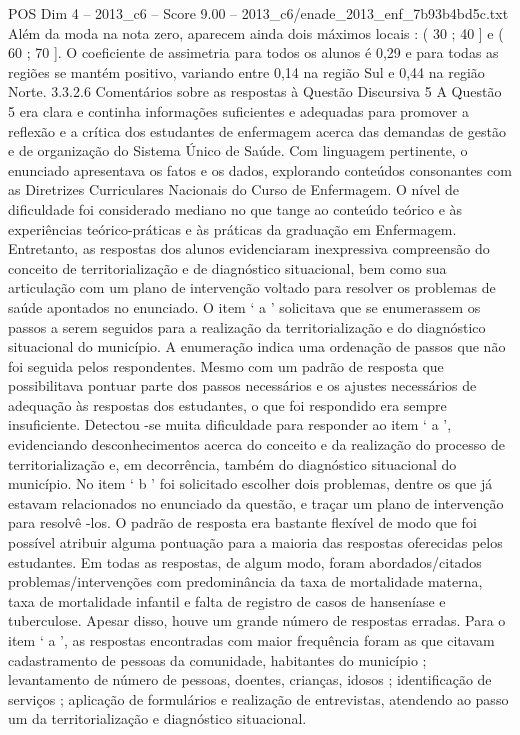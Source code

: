 \begin{textsample}{POS Dim 4 – 2013\_c6 – Score 9.00 – 2013\_c6/enade\_2013\_enf\_7b93b4bd5c.txt}
Além da moda na nota zero, aparecem ainda dois máximos locais : ( 30 ; 40 ] e ( 60 ; 70 ].
O coeficiente de assimetria para todos os alunos é 0,29 e para todas as regiões se mantém positivo, variando entre 0,14 na região Sul e 0,44 na região Norte. 3.3.2.6 Comentários sobre as respostas à Questão Discursiva 5 A Questão 5 era clara e continha informações suficientes e adequadas para promover a reflexão e a crítica dos estudantes de enfermagem acerca das demandas de gestão e de organização do Sistema Único de Saúde.
Com linguagem pertinente, o enunciado apresentava os fatos e os dados, explorando conteúdos consonantes com as Diretrizes Curriculares Nacionais do Curso de Enfermagem.
O nível de dificuldade foi considerado mediano no que tange ao conteúdo teórico e às experiências teórico-práticas e às práticas da graduação em Enfermagem.
Entretanto, as respostas dos alunos evidenciaram inexpressiva compreensão do conceito de territorialização e de diagnóstico situacional, bem como sua articulação com um plano de intervenção voltado para resolver os problemas de saúde apontados no enunciado.
O item ‘ a ’ solicitava que se enumerassem os passos a serem seguidos para a realização da territorialização e do diagnóstico situacional do município.
A enumeração indica uma ordenação de passos que não foi seguida pelos respondentes.
Mesmo com um padrão de resposta que possibilitava pontuar parte dos passos necessários e os ajustes necessários de adequação às respostas dos estudantes, o que foi respondido era sempre insuficiente.
Detectou -se muita dificuldade para responder ao item ‘ a ’, evidenciando desconhecimentos acerca do conceito e da realização do processo de territorialização e, em decorrência, também do diagnóstico situacional do município.
No item ‘ b ’ foi solicitado escolher dois problemas, dentre os que já estavam relacionados no enunciado da questão, e traçar um plano de intervenção para resolvê -los.
O padrão de resposta era bastante flexível de modo que foi possível atribuir alguma pontuação para a maioria das respostas oferecidas pelos estudantes.
Em todas as respostas, de algum modo, foram abordados/citados problemas/intervenções com predominância da taxa de mortalidade materna, taxa de mortalidade infantil e falta de registro de casos de hanseníase e tuberculose.
Apesar disso, houve um grande número de respostas erradas.
Para o item ‘ a ’, as respostas encontradas com maior frequência foram as que citavam cadastramento de pessoas da comunidade, habitantes do município ; levantamento de número de pessoas, doentes, crianças, idosos ; identificação de serviços ; aplicação de formulários e realização de entrevistas, atendendo ao passo um da territorialização e diagnóstico situacional.

\end{textsample}

